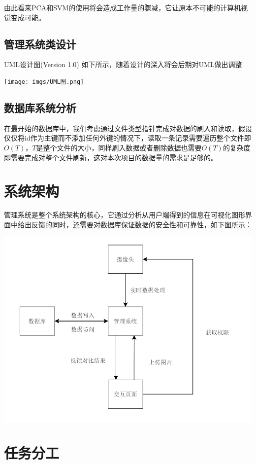 \documentclass{article}
\begin{document}
由此看来PCA和SVM的使用将会造成工作量的骤减，它让原本不可能的计算机视觉变成可能。

\subsection{管理系统类设计}
UML设计图(Version 1.0) 如下所示，随着设计的深入将会后期对UML做出调整

\texttt{[image: imgs/UML图.png]}

\subsection{数据库系统分析}
在最开始的数据库中，我们考虑通过文件类型指针完成对数据的刷入和读取，假设仅仅将id作为主键而不添加任何外键的情况下，读取一条记录需要遍历整个文件即$O(T)$，$T$是整个文件的大小，同样刷入数据或者删除数据也需要$O(T)$的复杂度即需要完成对整个文件刷新，这对本次项目的数据量的需求是足够的。
 
\section{系统架构}
管理系统是整个系统架构的核心，它通过分析从用户端得到的信息在可视化图形界面中给出反馈的同时，还需要对数据库保证数据的安全性和可靠性，如下图所示：

\includegraphics[scale=0.4] {imgs/系统概括.png}

\section{任务分工}
\end{document}
